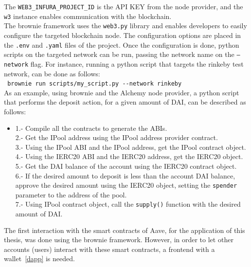 \documentclass[11pt,a4paper]{report}
\begin{document}
The \verb|WEB3_INFURA_PROJECT_ID| is the API KEY from the node provider, and the \verb|w3| instance enables communication with the blockchain.\\
The brownie framework\cite{brow} uses the \verb|web3.py| library and enables developers to easily configure the targeted blockchain node. The configuration options are placed in the \verb|.env| and \verb|.yaml| files of the project. Once the configuration is done, python scripts on the targeted network can be run, passing the network name on the \verb|–network| flag. For instance, running a python script that targets the rinkeby test network, can be done as follows:\\
\hspace{1cm}\verb| brownie run scripts/my_script.py --network rinkeby|\\
As an example, using brownie  and the Alchemy node provider, a python script that performs the deposit action, for a given amount of DAI, can be described as follows:
\begin{itemize}
	\item[]
	1.- Compile all the contracts to generate the ABIs.\\
	2.- Get the IPool address using the IPool address provider contract.\\
	3.- Using the IPool ABI and the IPool address, get the IPool contract object.\\
	4.- Using the IERC20 ABI and the IERC20 address, get the IERC20 object.\\
	5.- Get the DAI balance of the account using the IERC20 contract object.\\
	6.- If the desired amount to deposit is less than the account DAI balance, approve the desired amount using the IERC20 object, setting the \verb|spender| parameter to the address of the pool.\\
	7.- Using IPool contract object, call the \verb|supply()| function with the desired amount of DAI.
\end{itemize}
The first interaction with the smart contracts of Aave, for the application of this thesis, was done using the brownie framework. However, in order to let other accounts (users) interact with these smart contracts, a frontend with a wallet~\ref{dapp} is needed.
\end{document}
